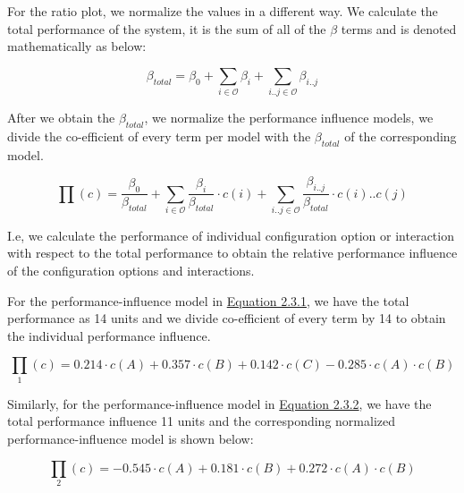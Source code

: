 \begin{description}[leftmargin=0pt]
  \item[Normalization: ] For the ratio plot, we normalize the values in a different way. We calculate the total performance of the system, it is the sum of all of the $\beta$ terms and is denoted mathematically as below:

\begin{equation*}
     \beta_{total} = \beta_{0} + \sum_{i \in \mathcal{O}}   {\beta_{\textit{i}}} + \sum_{i..j \in \mathcal{O}} {\beta_{\textit{i..j}}}
  \tag{2.3.7}\label{eq:2.3.7} 
\end{equation*}

After we obtain the $ \beta_{total}$, we normalize the performance influence models, we divide the co-efficient of every term per model with the $\beta_{total}$ of the corresponding model.

\begin{equation*}
  \prod {(c)} = \frac{\beta_{\mathrm{0}}}{\beta_{total}}  + \sum_{i \in \mathcal{O}} \frac{\beta_{\textit{i}}}{\beta_{total}} \cdot {c(i)} + 
 \sum_{i..j \in \mathcal{O}} 
 \frac{\beta_{\textit{i..j}}}{\beta_{total}} \cdot c(i)..c(j)
  \tag{2.3.8}\label{eq:2.3.8} 
\end{equation*}

I.e, we calculate the performance of individual configuration option or interaction with respect to the total performance to obtain the relative performance influence of the configuration options and interactions.

  
 For the performance-influence model in \hyperref[eq:2.3.1]{Equation 2.3.1}, we have the total performance as 14 units and we divide co-efficient of every term by 14 to obtain the individual performance influence.

\begin{equation*}
  \prod_1{(c)} = 0.214 \cdot c(A) + 0.357  \cdot c(B) + 0.142 \cdot c(C) - 0.285 \cdot  c(A) \cdot c(B)
   \tag{2.3.9}\label{eq:2.3.9}
\end{equation*}

Similarly, for the performance-influence model in \hyperref[eq:2.3.2]{Equation 2.3.2}, we have the total performance influence 11 units and the corresponding normalized performance-influence model is shown below:

\begin{equation*}
  \prod_2{(c)} = - 0.545 \cdot c(A) + 0.181 \cdot c(B) + 0.272 \cdot  c(A) \cdot c(B)
   \tag{2.3.10}\label{eq:2.3.10}
\end{equation*}


\end{description}
